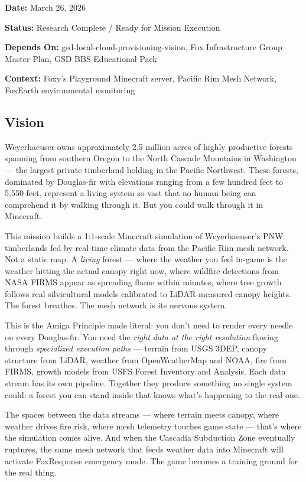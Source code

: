 \documentclass[11pt,letterpaper]{article}
\newcommand{\metafield}[2]{\textbf{\sffamily #1} #2\par}
\begin{document}
\metafield{Date:}{March 26, 2026}
\metafield{Status:}{Research Complete / Ready for Mission Execution}
\metafield{Depends On:}{gsd-local-cloud-provisioning-vision, Fox Infrastructure Group Master Plan, GSD BBS Educational Pack}
\metafield{Context:}{Foxy's Playground Minecraft server, Pacific Rim Mesh Network, FoxEarth environmental monitoring}

\subsection{Vision}

Weyerhaeuser owns approximately 2.5 million acres of highly productive forests spanning from southern Oregon to the North Cascade Mountains in Washington --- the largest private timberland holding in the Pacific Northwest. These forests, dominated by Douglas-fir with elevations ranging from a few hundred feet to 5,550 feet, represent a living system so vast that no human being can comprehend it by walking through it. But you could walk through it in Minecraft.

This mission builds a 1:1-scale Minecraft simulation of Weyerhaeuser's PNW timberlands fed by real-time climate data from the Pacific Rim mesh network. Not a static map. A \emph{living} forest --- where the weather you feel in-game is the weather hitting the actual canopy right now, where wildfire detections from NASA FIRMS appear as spreading flame within minutes, where tree growth follows real silvicultural models calibrated to LiDAR-measured canopy heights. The forest breathes. The mesh network is its nervous system.

This is the Amiga Principle made literal: you don't need to render every needle on every Douglas-fir. You need the \emph{right data at the right resolution} flowing through \emph{specialized execution paths} --- terrain from USGS 3DEP, canopy structure from LiDAR, weather from OpenWeatherMap and NOAA, fire from FIRMS, growth models from USFS Forest Inventory and Analysis. Each data stream has its own pipeline. Together they produce something no single system could: a forest you can stand inside that knows what's happening to the real one.

The spaces between the data streams --- where terrain meets canopy, where weather drives fire risk, where mesh telemetry touches game state --- that's where the simulation comes alive. And when the Cascadia Subduction Zone eventually ruptures, the same mesh network that feeds weather data into Minecraft will activate FoxResponse emergency mode. The game becomes a training ground for the real thing.
\end{document}
